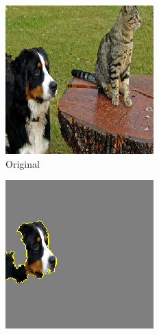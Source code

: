 \documentclass[sigconf]{acmart}
\begin{document}
\begin{figure}[ht]
  \centering
  \begin{subfigure}{0.32\linewidth}
    \includegraphics[width=\linewidth]{figures/lime_orig.png}
    \caption{Original}
    \label{fig:bird-a}
  \end{subfigure}
  \begin{subfigure}{0.32\linewidth}
    \includegraphics[width=\linewidth]{figures/lime_dog_mask.png}

\end{subfigure}
\end{figure}
\end{document}
